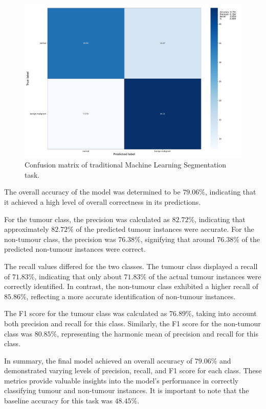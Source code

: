 \begin{figure}
  \includegraphics[width=\linewidth]{Figures/Confusion_Matrix_ML_Segmentation.pdf}
  \caption{Confusion matrix of traditional Machine Learning Segmentation task.}
  \label{Figure - ML_Segmentation Confusion matrix}
\end{figure}
The overall accuracy of the model was determined to be $79.06\%$, indicating that it achieved a high level of overall correctness in its predictions.

For the tumour class, the precision was calculated as $82.72\%$, indicating that approximately $82.72\%$ of the predicted tumour instances were accurate. For the non-tumour class, the precision was $76.38\%$, signifying that around $76.38\%$ of the predicted non-tumour instances were correct.

The recall values differed for the two classes. The tumour class displayed a recall of $71.83\%$, indicating that only about $71.83\%$ of the actual tumour instances were correctly identified. In contrast, the non-tumour class exhibited a higher recall of $85.86\%$, reflecting a more accurate identification of non-tumour instances.

The F1 score for the tumour class was calculated as $76.89\%$, taking into account both precision and recall for this class. Similarly, the F1 score for the non-tumour class was $80.85\%$, representing the harmonic mean of precision and recall for this class.

In summary, the final model achieved an overall accuracy of $79.06\%$ and demonstrated varying levels of precision, recall, and F1 score for each class. These metrics provide valuable insights into the model's performance in correctly classifying tumour and non-tumour instances. It is important to note that the baseline accuracy for this task was $48.45\%$.


